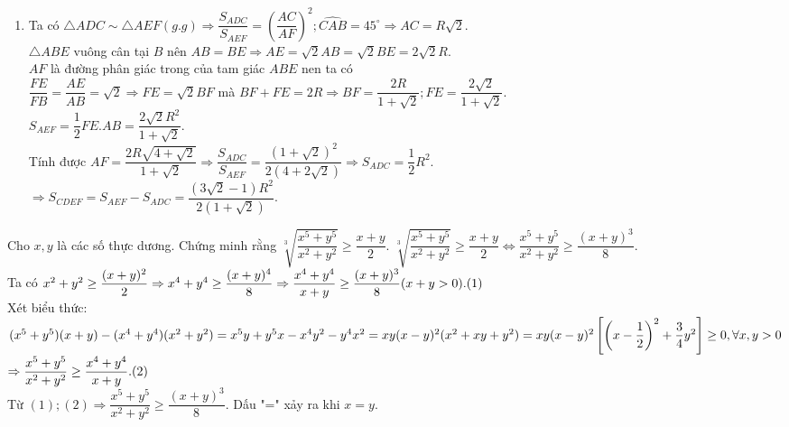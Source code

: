 \begin{ex}
{\begin{enumerate}
		$\widehat{CDA}+\widehat{CDF}=180^\circ\Rightarrow \widehat{CDF}+\widehat{CEF}=180^\circ \Rightarrow$ tứ giác $CDEF$ nội tiếp.
		\item Ta có $\triangle ADC \sim \triangle AEF (g.g)\Rightarrow \dfrac{S_{ADC}}{S_{AEF}}=\left( \dfrac{AC}{AF}\right)^2; \widehat{CAB}=45^\circ \Rightarrow AC=R\sqrt{2}$.\\
		$\triangle ABE$ vuông cân tại $B$ nên $AB=BE\Rightarrow AE=\sqrt{2}AB=\sqrt{2}BE=2\sqrt{2}R$.\\
		$AF$ là đường phân giác trong của tam giác $ABE$ nen ta có\\
		$\dfrac{FE}{FB}=\dfrac{AE}{AB}=\sqrt{2}\Rightarrow FE=\sqrt{2} BF$ mà $BF+FE=2R\Rightarrow BF=\dfrac{2R}{1+\sqrt{2}};FE=\dfrac{2\sqrt{2}}{1+\sqrt{2}}.$\\
		$S_{AEF}=\dfrac{1}{2} FE.AB=\dfrac{2\sqrt{2}R^2}{1+\sqrt{2}}.$\\
		Tính được $AF=\dfrac{2R\sqrt{4+\sqrt{2}}}{1+\sqrt{2}}\Rightarrow\dfrac{S_{ADC}}{S_{AEF}}=\dfrac{(1+\sqrt{2})^2}{2(4+2\sqrt{2})}\Rightarrow S_{ADC}=\dfrac{1}{2}R^2.$\\
		$\Rightarrow S_{CDEF}=S_{AEF}-S_{ADC}=\dfrac{(3\sqrt{2}-1)R^2}{2(1+\sqrt{2})}.$
			\end{enumerate}
}
\end{ex}

\begin{ex}%
Cho $x,y$ là các số thực dương. Chứng minh rằng $\sqrt[3]{\dfrac{x^5+y^5}{x^2+y^2}}\geq \dfrac{x+y}{2}$.
\loigiai
{$\sqrt[3]{\dfrac{x^5+y^5}{x^2+y^2}}\geq \dfrac{x+y}{2}\Leftrightarrow \dfrac{x^5+y^5}{x^2+y^2}\geq \dfrac{(x+y)^3}{8}$.\\
	Ta có $x^2+y^2\geq \dfrac{(x+y)^2}{2}\Rightarrow x^4+y^4\geq \dfrac{(x+y)^4}{8}\Rightarrow\dfrac{x^4+y^4}{x+y}\geq \dfrac{(x+y)^3}{8}(x+y>0). \hfill (1)$\\
	Xét biểu thức:\\
	$(x^5+y^5)(x+y)-(x^4+y^4)(x^2+y^2)=x^5y+y^5x-x^4y^2-y^4x^2\\=xy(x-y)^2(x^2+xy+y^2)=xy(x-y)^2\left[ \left(x-\dfrac{1}{2}\right)^2+\dfrac{3}{4}y^2  \right] \geq 0,\forall x,y>0$\\
	$\Rightarrow \dfrac{x^5+y^5}{x^2+y^2}\geq \dfrac{x^4+y^4}{x+y}. \hfill(2)$\\
	Từ $(1);(2)\Rightarrow \dfrac{x^5+y^5}{x^2+y^2}\geq \dfrac{(x+y)^3}{8}$.
	Dấu "=" xảy ra khi $x=y$.	
}
\end{ex}
